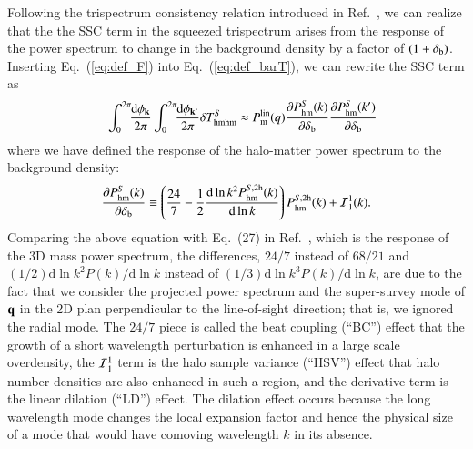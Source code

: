 \documentclass[onecolumn,notitlepage,showpacs,amsmath,amssymb,prd,floatfix]{revtex4-1}
\newcommand{\bk}{{\bf k}}
\newcommand{\bq}{{\bf q}}
\newcommand{\dr}{\mathrm{d}}
\newcommand{\deltab}{\delta_{\rm b}}
\newcommand{\phm}{P_{\mathrm{hm}}}
\newcommand{\pml}{P^{\rm lin}_{\rm m}}
\begin{document}
Following the trispectrum consistency relation introduced in
Ref.~\cite{TakadaHu:13}, we can realize that the the SSC term in the
squeezed trispectrum arises from the response of the power spectrum to
change in the background density by a factor of $(1+\deltab)$.
Inserting Eq.~(\ref{eq:def_F}) into Eq.~(\ref{eq:def_barT}), we can
rewrite the SSC term as 
%
\begin{eqnarray}
&& \int_0^{2\pi}\!\!\frac{\dr\phi_\bk}{2\pi}
\int_0^{2\pi}\!\!\frac{\dr\phi_{\bk'}}{2\pi}\delta T^S_{\rm hmhm}
 \approx
\pml(q)\frac{\partial \phm^S(k)}{\partial \deltab}\frac{\partial \phm^S(k')}{\partial \deltab}
\end{eqnarray}
%
where we have defined the response of the halo-matter power spectrum to
the background density:
%
\begin{equation}
 \frac{\partial \phm^S(k)}{\partial \deltab}\equiv 
  \left(\frac{24}{7}-\frac{1}{2}\frac{\dr\ln k^2\phm^{S,{\rm
   2h}}(k)}{\dr \ln k}\right)\phm^{S,{\rm 2h}}(k) + {\cal I}^1_1(k).
\end{equation}
%
Comparing the above equation with Eq.~(27) in Ref.~\cite{Lietal:14a},
which is the response of the 3D mass power spectrum, the differences,
$24/7$ instead of $68/21$ and $(1/2)\dr\ln k^2P(k)/\dr \ln k$ instead of
$(1/3)\dr\ln k^3P(k)/\dr \ln k$, are due to the fact that we consider
the projected power spectrum and the super-survey mode of $\bq$ in the
2D plan perpendicular to the line-of-sight direction; that is, we
ignored the radial mode.  The $24/7$ piece is called the beat coupling
(``BC'') effect \cite{Hamiltonetal:06,TakadaJain:09} that the growth of
a short wavelength perturbation is enhanced in a large scale
overdensity, the ${\cal I}^1_1$ term is the halo sample variance
(``HSV'') effect \cite{TakadaBridle:07,Satoetal:09} that halo number
densities are also enhanced in such a region, and the derivative term is
the linear dilation (``LD'') effect. The dilation effect occurs because
the long wavelength mode changes the local expansion factor and hence
the physical size of a mode that would have comoving wavelength $k$ in
its absence.
\end{document}
